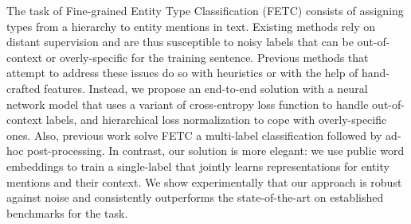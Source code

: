 The task of Fine-grained Entity Type Classification (FETC) consists of assigning types from a hierarchy to entity mentions in text. Existing methods rely on distant supervision and are thus susceptible to noisy labels that can be out-of-context or overly-specific for the training sentence. Previous methods that attempt to address these issues do so with heuristics or with the help of hand-crafted features. Instead, we propose an end-to-end solution with a neural network model that uses a variant of cross-entropy loss function to handle out-of-context labels, and hierarchical loss normalization to cope with overly-specific ones. Also, previous work solve FETC a multi-label classification followed by ad-hoc post-processing. In contrast, our solution is more elegant: we use public word embeddings to train a single-label that jointly learns representations for entity mentions and their context. We show experimentally that our approach is robust against noise and consistently outperforms the state-of-the-art on established benchmarks for the task.
